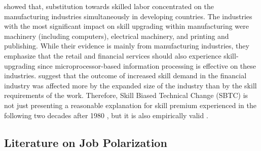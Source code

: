 \begin{onehalfspace}
\citet{1998Berman} showed that, substitution towards skilled labor
concentrated on the manufacturing industries simultaneously in developing
countries. The industries with the most significant impact on skill
upgrading within manufacturing were machinery (including computers),
electrical machinery, and printing and publishing. While their evidence
is mainly from manufacturing industries, they emphasize that the retail
and financial services should also experience skill-upgrading since
microprocessor-based information processing is effective on these
industries. \citet{1996Levy} suggest that the outcome of increased
skill demand in the financial industry was affected more by the expanded
size of the industry than by the skill requirements of the work. Therefore,
Skill Biased Technical Change (SBTC) is not just presenting a reasonable
explanation for skill premium experienced in the following two decades
after 1980 \citep{2002Acemoglu}, but it is also empirically valid
\citep{1992Katz,1998Autor}.
\end{onehalfspace}

\subsection{Literature on Job Polarization}


